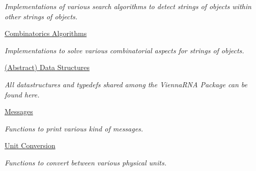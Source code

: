 \begin{DoxyCompactItemize}
\begin{DoxyCompactList}\small\item\em Implementations of various search algorithms to detect strings of objects within other strings of objects. \end{DoxyCompactList}\item 
\hyperlink{group__combinatorics__utils}{Combinatorics Algorithms}
\begin{DoxyCompactList}\small\item\em Implementations to solve various combinatorial aspects for strings of objects. \end{DoxyCompactList}\item 
\hyperlink{group__data__structures}{(\+Abstract) Data Structures}
\begin{DoxyCompactList}\small\item\em All datastructures and typedefs shared among the Vienna\+R\+NA Package can be found here. \end{DoxyCompactList}\item 
\hyperlink{group__message__utils}{Messages}
\begin{DoxyCompactList}\small\item\em Functions to print various kind of messages. \end{DoxyCompactList}\item 
\hyperlink{group__units}{Unit Conversion}
\begin{DoxyCompactList}\small\item\em Functions to convert between various physical units. \end{DoxyCompactList}\end{DoxyCompactItemize}
